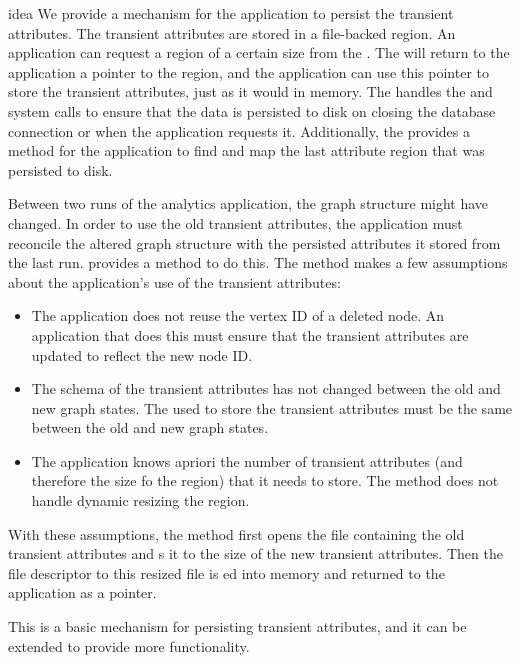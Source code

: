\begin{statusbar}{idea}
We provide a mechanism for the application to persist the transient attributes.
The transient attributes are stored in a file-backed  region.
An application can request a  region of a certain size from the \project{} \api{}.
The \api{} will return to the application a pointer to the region, and the application can use this pointer to store the transient attributes, just as it would in memory.
The \api{} handles the  and  system calls to ensure that the data is persisted to disk on closing the database connection or when the application requests it.
Additionally, the \api{} provides a method for the application to find and map the last attribute region that was persisted to disk.

Between two runs of the analytics application, the graph structure might have changed.
In order to use the old transient attributes, the application must reconcile the altered graph structure with the persisted attributes it stored from the last run.
\api{} provides a  method to do this.
The  method makes a few assumptions about the application's use of the transient attributes:

\begin{itemize}
  \item The application does not reuse the vertex ID of a deleted node. An application that does this must ensure that the transient attributes are updated to reflect the new node ID.
  \item The schema of the transient attributes has not changed between the old and new graph states. The  used to store the transient attributes must be the same between the old and new graph states.
  \item The application knows apriori the number of transient attributes (and therefore the size fo the  region) that it needs to store. The  method does not handle dynamic resizing the  region.
\end{itemize}
With these assumptions, the  method first opens the file containing the old transient attributes and s it to the size of the new transient attributes. 
Then the file descriptor to this resized file is ed into memory and returned to the application as a pointer.

This is a basic mechanism for persisting transient attributes, and it can be extended to provide more functionality.
\end{statusbar}

